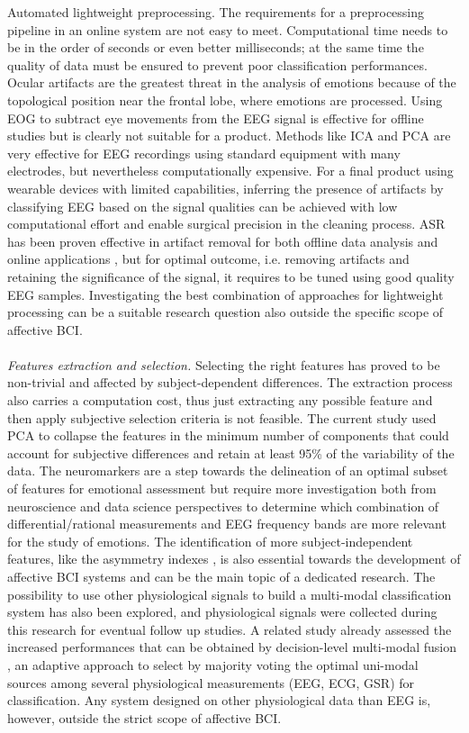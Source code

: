 Automated lightweight preprocessing. The requirements for a preprocessing pipeline in an online system are not easy to meet. Computational time needs to be in the order of seconds or even better milliseconds; at the same time the quality of data must be ensured to prevent poor classification performances. Ocular artifacts are the greatest threat in the analysis of emotions because of the topological position near the frontal lobe, where emotions are processed. Using \ac{EOG} to subtract eye movements from the EEG signal is effective for offline studies but is clearly not suitable for a product. Methods like \ac{ICA} and \ac{PCA} are very effective for \ac{EEG} recordings using standard equipment with many electrodes, but nevertheless computationally expensive. For a final product using wearable devices with limited capabilities, inferring the presence of artifacts by classifying \ac{EEG} based on the signal qualities \cite{grosselin_quality_2019} can be achieved with low computational effort and enable surgical precision in the cleaning process. \ac{ASR} has been proven effective in artifact removal for both offline data analysis and online applications \cite{chang_evaluation_2018}, but for optimal outcome, i.e. removing artifacts and retaining the significance of the signal, it requires to be tuned using good quality \ac{EEG} samples. Investigating the best combination of approaches for lightweight processing can be a suitable research question also outside the specific scope of affective \ac{BCI}.
\\
\\
\emph{Features extraction and selection.} Selecting the right features has proved to be non-trivial and affected by subject-dependent differences. The extraction process also carries a computation cost, thus just extracting any possible feature and then apply subjective selection criteria is not feasible. The current study used \ac{PCA} to collapse the features in the minimum number of components that could account for subjective differences and retain at least 95\% of the variability of the data. The neuromarkers are a step towards the delineation of an optimal subset of features for emotional assessment but require more investigation both from neuroscience and data science perspectives to determine which combination of differential/rational measurements and EEG frequency bands are more relevant for the study of emotions. The identification of more subject-independent features, like the asymmetry indexes \cite{lin_toward_2015}, is also essential towards the development of affective \ac{BCI} systems and can be the main topic of a dedicated research. The possibility to use other physiological signals to build a multi-modal classification system has also been explored, and physiological signals were collected during this research for eventual follow up studies. A related study already assessed the increased performances that can be obtained by decision-level multi-modal fusion \cite{thammasan_multimodal_2017}, an adaptive approach to select by majority voting the optimal uni-modal sources among several physiological measurements (\ac{EEG}, \ac{ECG}, \ac{GSR}) for classification. Any system designed on other physiological data than \ac{EEG} is, however, outside the strict scope of affective \ac{BCI}.
